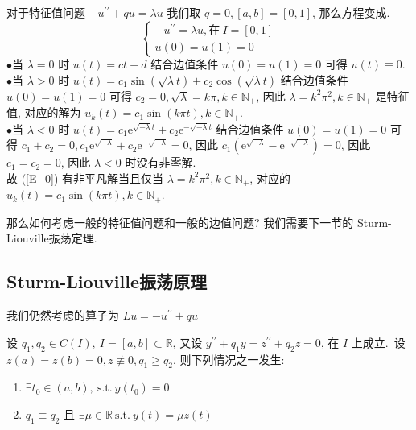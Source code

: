 \documentclass[11pt]{ctexart}[UTF8]
\begin{document}
对于特征值问题 $-u^{\prime\prime} + q u = \lambda u$ 我们取 $q = 0, [a,b]=[0,1]$, 那么方程变成.
\begin{equation}\label{E_0}
    \begin{cases}
        -u^{\prime\prime} = \lambda u, \text{在}\  I=[0,1] \\
        u(0) = u(1) = 0
    \end{cases}
\end{equation}
$\bullet $当 $\lambda = 0$ 时 $u(t)=ct+d$ 结合边值条件 $u(0)=u(1)=0$ 可得 $u(t) \equiv 0$.\\
$\bullet $当 $\lambda > 0$ 时 $u(t) = c_{1} \sin(\sqrt{\lambda} t) + c_{2} \cos(\sqrt{\lambda} t)$ 结合边值条件 $u(0)=u(1)=0$ 可得 $c_{2}=0, \sqrt{\lambda} = k\pi, k \in \mathbb{N}_{+}$, 因此 $\lambda = k^2 \pi^2, k \in \mathbb{N}_{+}$ 是特征值, 
对应的解为 $u_{k}(t) = c_{1} \sin(k\pi t), k \in \mathbb{N}_{+}$.\\
$\bullet $当 $\lambda < 0$ 时 $u(t) = c_{1} \mathrm{e}^{\sqrt{-\lambda} t} + c_{2} \mathrm{e}^{-\sqrt{-\lambda} t}$ 结合边值条件 $u(0)=u(1)=0$ 可得 $c_{1}+c_{2}=0, c_{1} \mathrm{e}^{\sqrt{-\lambda}} + c_{2} \mathrm{e}^{-\sqrt{-\lambda}} = 0$, 
因此 $c_{1}( \mathrm{e}^{\sqrt{-\lambda}} - \mathrm{e}^{-\sqrt{-\lambda}}) = 0$, 因此 $c_{1}=c_{2}=0$, 因此 $\lambda < 0$ 时没有非零解.\\
故 (\ref{E_0}) 有非平凡解当且仅当 $\lambda = k^2 \pi^2, k \in \mathbb{N}_{+}$, 对应的$u_{k}(t) = c_{1} \sin(k\pi t), k \in \mathbb{N}_{+}$.\par
那么如何考虑一般的特征值问题和一般的边值问题? 我们需要下一节的 Sturm-Liouville振荡定理.
\subsection{Sturm-Liouville振荡原理}
我们仍然考虑的算子为 $Lu = -u^{\prime\prime} + qu$
\begin{theorem}\label{S-L-oscillation}
    设 $q_{1},q_{2}\in C(I),\ I = [a,b]\subset \mathbb{R}$, 又设 $y^{\prime\prime} + q_{1}y = z^{\prime\prime}+q_{2}z=0$, 在 $I$ 上成立.\ 
    设 $z(a)=z(b)=0, z \not\equiv 0, q_{1} \geq q_{2}$, 则下列情况之一发生:
    \begin{enumerate}
        \item $\exists t_{0}\in (a,b),\  \mathrm{s.t.}\ y(t_{0}) = 0$
        \item $q_{1} \equiv q_{2}$ 且 $\exists \mu \in \mathbb{R}\ \mathrm{s.t.}\ y(t) = \mu z(t)$
    \end{enumerate}
\end{theorem}
\end{document}
